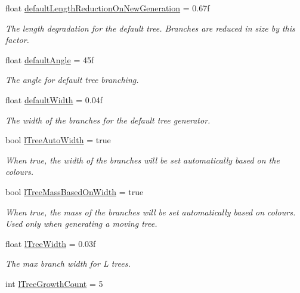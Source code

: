 \begin{DoxyCompactItemize}
float \hyperlink{class_fractal_tree_1_1_tree_builder_a002013c39a026974af2745840d7784bd}{default\+Length\+Reduction\+On\+New\+Generation} = 0.\+67f
\begin{DoxyCompactList}\small\item\em The length degradation for the default tree. Branches are reduced in size by this factor. \end{DoxyCompactList}\item 
float \hyperlink{class_fractal_tree_1_1_tree_builder_a71036891662e482caeb410dadd5bfe65}{default\+Angle} = 45f
\begin{DoxyCompactList}\small\item\em The angle for default tree branching. \end{DoxyCompactList}\item 
float \hyperlink{class_fractal_tree_1_1_tree_builder_a1f60a72d865f9cca5bb155a72ff5f6ef}{default\+Width} = 0.\+04f
\begin{DoxyCompactList}\small\item\em The width of the branches for the default tree generator. \end{DoxyCompactList}\item 
bool \hyperlink{class_fractal_tree_1_1_tree_builder_acc1a7487b339290c552ef136fec40b02}{l\+Tree\+Auto\+Width} = true
\begin{DoxyCompactList}\small\item\em When true, the width of the branches will be set automatically based on the colours. \end{DoxyCompactList}\item 
bool \hyperlink{class_fractal_tree_1_1_tree_builder_a4ba732b60fd74e4db9f5422a7e9ffd82}{l\+Tree\+Mass\+Based\+On\+Width} = true
\begin{DoxyCompactList}\small\item\em When true, the mass of the branches will be set automatically based on colours. Used only when generating a moving tree. \end{DoxyCompactList}\item 
float \hyperlink{class_fractal_tree_1_1_tree_builder_a382d4bba4cac7e05681e75109801dd92}{l\+Tree\+Width} = 0.\+03f
\begin{DoxyCompactList}\small\item\em The max branch width for L trees. \end{DoxyCompactList}\item 
int \hyperlink{class_fractal_tree_1_1_tree_builder_af50b64e86abfc4709fdfc6368ff7504b}{l\+Tree\+Growth\+Count} = 5

\end{DoxyCompactItemize}
